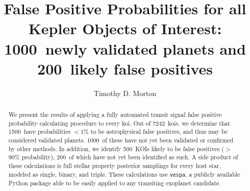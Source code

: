 \documentclass{emulateapj}
\newcommand{\ncalc}{7242}
\newcommand{\nval}{1500}
\newcommand{\nvalnew}{1000}
\newcommand{\nfp}{500}
\newcommand{\nfpnew}{200}
\newcommand{\vespa}{\texttt{vespa}}
\begin{document}

\title{False Positive Probabilities for all Kepler Objects of Interest: \\
        \nvalnew\ newly validated planets and \nfpnew\ likely false positives}


\author{Timothy D. Morton}



\begin{abstract}
We present the results of applying a fully automated transit signal
false positive probability calculating procedure to every \ac{koi}.
Out of \ncalc\ \acp{koi}, we determine that \nval\ have probabilities
$<$1\% to be astrophysical false positives, and thus may be considered
validated planets.  \nvalnew\ of these have not yet been validated or
confirmed by other methods.  In addition, we identify \nfp\ KOIs
likely to be false positives ($>$90\% probability), \nfpnew\ of which
have not yet been identified as such. A side product of these
calculations is full stellar property posterior samplings for every
host star, modeled as single, binary, and triple.  These calculations
use \vespa, a publicly available Python package able to be easily
applied to any transiting exoplanet candidate.
\end{abstract}

\end{document}
